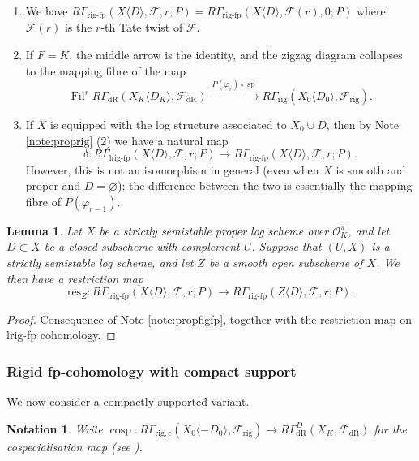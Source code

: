 \documentclass[cjm]{ipart}
\theoremstyle{plain}
\newtheorem{lemma}[theorem]{Lemma}
\newtheorem{notation}[theorem]{Notation}
\theoremstyle{remark}
\DeclareMathOperator{\cosp}{cosp}
\DeclareMathOperator{\Fil}{Fil}
\DeclareMathOperator{\lrigfp}{lrig-fp}
\DeclareMathOperator{\rigfp}{rig-fp}
\newcommand{\cO}{\mathcal{O}}
\newcommand{\dR}{\mathrm{dR}}
\newcommand{\res}{\mathrm{res}}
\newcommand{\rig}{\mathrm{rig}}
\newcommand{\sF}{\mathscr{F}}
\numberwithin{equation}{subsection}
\begin{document}
  \begin{note}\label{note:propfigfp}
   \begin{enumerate}
    \item We have $R\Gamma_{\rigfp}(X\langle D\rangle,\sF,r;P) = R\Gamma_{\rigfp}(X\langle D\rangle,\sF(r),0; P)$ where $\sF(r)$ is the $r$-th Tate twist of $\sF$.
    \item If $F = K$, the middle arrow is the identity, and the zigzag diagram collapses to the mapping fibre of the map
    \[  \Fil^r R\Gamma_{\dR}(X_K\langle D_K\rangle, \sF_{\dR}) \xrightarrow{\ P(\varphi_r) \circ \operatorname{sp}\ } R\Gamma_{\rig}(X_0\langle D_0\rangle,\sF_{\rig}).\]
    \item If $X$ is equipped with the log structure associated to $X_0 \cup D$, then by Note \ref{note:proprig} (2) we have a natural map
    \[
     \delta: R\Gamma_{\lrigfp}(X\langle D\rangle,\sF,r;P) \to R\Gamma_{\rigfp}(X\langle D\rangle,\sF,r;P).
    \]
    However, this is not an isomorphism in general (even when $X$ is smooth and proper and $D = \varnothing$); the difference between the two is essentially the mapping fibre of $P(\varphi_{r-1})$.\qedhere
   \end{enumerate}
  \end{note}

  \begin{lemma}\label{lem:reslogfptofp}
   Let $X$ be a strictly semistable proper log scheme over $\cO_K^\pi$, and let $D\subset X$ be a closed subscheme with complement $U$. Suppose that $(U,X)$ is a strictly semistable log scheme, and let $Z$ be a smooth open subscheme of $X$. We then have a restriction map
   \[ \res_Z: R\Gamma_{\lrigfp}(X\langle D\rangle,\sF,r;P)\to R\Gamma_{\rigfp}(Z\langle D\rangle,\sF,r;P).\]
  \end{lemma}
  \begin{proof}
   Consequence of Note \ref{note:propfigfp}, together with the restriction map on lrig-fp cohomology.
  \end{proof}


  \subsubsection*{Rigid fp-cohomology with compact support}

   We now consider a compactly-supported variant.

   \begin{notation}
    Write $\cosp: R\Gamma_{\rig,c}(X_0\langle -D_0\rangle,\sF_{\rig})\rightarrow R\Gamma^D_{\dR}(X_K,\sF_{\dR})$ for the cospecialisation map (see \cite{baldassarrietal04}).
   \end{notation}
\end{document}
